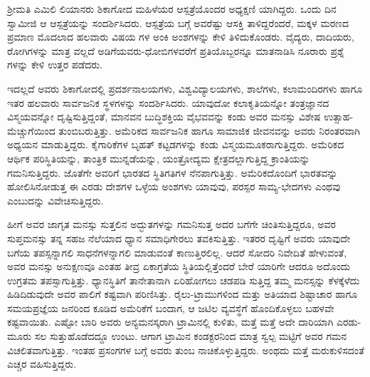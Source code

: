 ಶ್ರೀಮತಿ ಎಮಿಲಿ ಲಿಯಾನರು ಶಿಕಾಗೋದ ಮಹಿಳೆಯರ ಆಸ್ಪತ್ರೆಯೊಂದರ ಅಧ್ಯಕ್ಷಣಿ ಯಾಗಿದ್ದರು. ಒಂದು ದಿನ ಸ್ವಾಮೀಜಿ ಆ ಆಸ್ಪತ್ರೆಯನ್ನು ಸಂದರ್ಶಿಸಿದರು. ಆಸ್ಪತ್ರೆಯ ಬಗ್ಗೆ ಅವರೆಷ್ಟು ಆಸಕ್ತಿ ತಾಳಿದ್ದರೆಂದರೆ, ಮಕ್ಕಳ ಮರಣದ ಪ್ರಮಾಣ ಮೊದಲಾದ ಹಲವಾರು ವಿಷಯ ಗಳ ಅಂಕಿ ಅಂಶಗಳನ್ನು ಕೇಳಿ ತಿಳಿದುಕೊಂಡರು. ವೈದ್ಯರು, ದಾದಿಯರು, ರೋಗಿಗಳನ್ನು ಮಾತ್ರ ವಲ್ಲದೆ ಅಡಿಗೆಯವರು-ಧೋಬಿಗಳವರೆಗೆ ಪ್ರತಿಯೊಬ್ಬರನ್ನೂ ಮಾತನಾಡಿಸಿ ನೂರಾರು ಪ್ರಶ್ನೆ ಗಳನ್ನು ಕೇಳಿ ಉತ್ತರ ಪಡೆದರು.

ಇದಲ್ಲದೆ ಅವರು ಶಿಕಾಗೋದಲ್ಲಿ ಪ್ರದರ್ಶನಾಲಯಗಳು, ವಿಶ್ವವಿದ್ಯಾಲಯಗಳು, ಶಾಲೆಗಳು, ಕಲಾಮಂದಿರಗಳು ಹಾಗೂ ಇತರ ಹಲವಾರು ಸಾರ್ವಜನಿಕ ಸ್ಥಳಗಳನ್ನು ಸಂದರ್ಶಿಸಿದರು. ಯಾವುದೋ ಕಲಾಕೃತಿಯನ್ನೋ ತಂತ್ರಜ್ಞಾನದ ವಿಸ್ಮಯವನ್ನೋ ದೃಷ್ಟಿಸುತ್ತಿದ್ದಂತೆ, ಮಾನವನ ಬುದ್ಧಿಶಕ್ತಿಯ ವೈಭವವನ್ನು ಕಂಡು ಅವರ ಮನಸ್ಸು ವಿಶೇಷ ಉತ್ಸಾಹ-ಮೆಚ್ಚುಗೆಯಿಂದ ತುಂಬಿಬರುತ್ತಿತ್ತು. ಅಮೆರಿಕದ ಸಾರ್ವಜನಿಕ ಹಾಗೂ ಸಾಮಾಜಿಕ ಜೀವನವನ್ನು ಅವರು ನಿರಂತರವಾಗಿ ಅಧ್ಯಯನ ಮಾಡುತ್ತಿದ್ದರು. ಕೈಗಾರಿಕೆಗಳ ಬೃಹತ್ ಕಟ್ಟಡಗಳನ್ನು ಕಂಡು ವಿಸ್ಮಯಮೂಕರಾಗುತ್ತಿದ್ದರು. ಅಮೆರಿಕದ ಆರ್ಥಿಕ ಪರಿಸ್ಥಿತಿಯನ್ನು, ತಾಂತ್ರಿಕ ಮುನ್ನಡೆಯನ್ನು, ಯಂತ್ರೋದ್ಯಮ ಕ್ಷೇತ್ರದಲ್ಲಾಗುತ್ತಿದ್ದ ಕ್ರಾಂತಿಯನ್ನು ಗಮನಿಸುತ್ತಿದ್ದರು. ಜೊತೆಗೇ ಅವರಿಗೆ ಭಾರತದ ಸ್ಥಿತಿಗತಿಗಳ ನೆನಪಾಗುತ್ತಿತ್ತು. ಅಮೆರಿಕದೊಂದಿಗೆ ಭಾರತವನ್ನು ಹೋಲಿಸಿನೋಡುತ್ತ ಈ ಎರಡು ದೇಶಗಳ ಒಳ್ಳೆಯ ಅಂಶಗಳು ಯಾವುವು, ಪರಸ್ಪರ ಸಾಮ್ಯ-ಭೇದಗಳು ಎಂಥವು ಎಂಬುದನ್ನು ವಿವೇಚಿಸುತ್ತಿದ್ದರು.

ಹೀಗೆ ಅವರ ಜಾಗೃತ ಮನಸ್ಸು ಸುತ್ತಲಿನ ಅದ್ಭುತಗಳನ್ನು ಗಮನಿಸುತ್ತ ಅದರ ಬಗೆಗೇ ಚಿಂತಿಸುತ್ತಿದ್ದರೂ, ಅವರ ಸುಪ್ತಮನಸ್ಸು ತನ್ನ ಸಹಜ ನೆಲೆಯಾದ ಧ್ಯಾನ ಸಮಾಧಿಗೇರಲು ತವಕಿಸುತ್ತಿತ್ತು. ಇತರರ ದೃಷ್ಟಿಗೆ ಅವರು ಯಾವುದೇ ಬಗೆಯ ತಪಸ್ಸನ್ನಾಗಲಿ ಸಾಧನೆಗಳನ್ನಾಗಲಿ ಮಾಡುವಂತೆ ಕಾಣುತ್ತಿರಲಿಲ್ಲ. ಆದರೆ ಸೋದರಿ ನಿವೇದಿತೆ ಹೇಳುವಂತೆ, ಅವರ ಮನಸ್ಸು ಅನುಕ್ಷಣವೂ ಎಂತಹ ತೀವ್ರ ಏಕಾಗ್ರತೆಯ ಸ್ಥಿತಿಯಲ್ಲಿತ್ತೆಂದರೆ ಬೇರೆ ಯಾರಿಗೇ ಆದರೂ ಅದೊಂದು ಉಗ್ರತಮ ತಪಸ್ಸಾಗುತ್ತಿತ್ತು. ಧ್ಯಾನಸ್ಥಿತಿಗೆ ತಾನೇತಾನಾಗಿ ಏರಿಹೋಗಲು ಚಡಪಡಿ ಸುತ್ತಿದ್ದ ತಮ್ಮ ಮನಸ್ಸನ್ನು ಕೆಳಕ್ಕೆಳೆದು ಹಿಡಿದಿಡುವುದೇ ಅವರ ಪಾಲಿಗೆ ಕಷ್ಟವಾಗಿ ಪರಿಣಿಸಿತ್ತು. ರೈಲು-ಟ್ರಾಮುಗಳಿಂದ ಮತ್ತು ಅತಿಯಾದ ಶಿಷ್ಟಾಚಾರ ಹಾಗೂ ಸಮಯಪ್ರಜ್ಞೆಯ ಜನರಿಂದ ಕೂಡಿದ ಅಮೆರಿಕೆಗೆ ಬಂದಾಗ, ಆ ಜಟಿಲ ವ್ಯವಸ್ಥೆಗೆ ಹೊಂದಿಕೊಳ್ಳಲು ಬಹಳವೇ ಕಷ್ಟವಾಯಿತು. ಎಷ್ಟೋ ಬಾರಿ ಅವರು ಅನ್ಯಮನಸ್ಕರಾಗಿ ಟ್ರಾಮಿನಲ್ಲಿ ಕುಳಿತು, ಮತ್ತೆ ಮತ್ತೆ ಅದೇ ದಾರಿಯಾಗಿ ಎರಡು-ಮೂರು ಸಲ ಸುತ್ತುಹೊಡೆದದ್ದೂ ಉಂಟು. ಆಗಾಗ ಟ್ರಾಮಿನ ಕಂಡಕ್ಟರನಿಂದ ಮಾತ್ರ ಸ್ವಲ್ಪ ಮಟ್ಟಿಗೆ ಅವರ ಗಮನ ವಿಚಲಿತವಾಗುತ್ತಿತ್ತು. ಇಂತಹ ಪ್ರಸಂಗಗಳ ಬಗ್ಗೆ ಅವರು ತುಂಬ ನಾಚಿಕೊಳ್ಳುತ್ತಿದ್ದರು. ಅಂಥದು ಮತ್ತೆ ಮರುಕುಳಿಸದಂತೆ ಎಚ್ಚರ ವಹಿಸುತ್ತಿದ್ದರು. 

